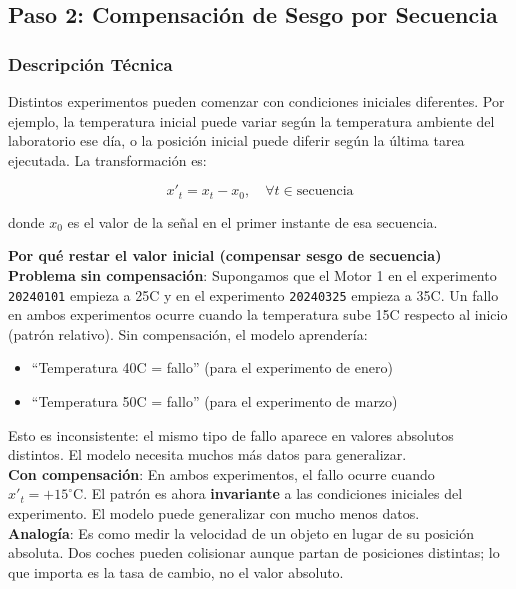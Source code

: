 \documentclass[12pt,a4paper]{article}
\begin{document}
\subsection{Paso 2: Compensaci\'{o}n de Sesgo por Secuencia}

\subsubsection{Descripci\'{o}n T\'{e}cnica}

Distintos experimentos pueden comenzar con condiciones iniciales diferentes. Por
ejemplo, la temperatura inicial puede variar seg\'{u}n la temperatura ambiente del
laboratorio ese d\'{i}a, o la posici\'{o}n inicial puede diferir seg\'{u}n la \'{u}ltima
tarea ejecutada. La transformaci\'{o}n es:

\begin{equation}
  x'_t = x_t - x_0, \quad \forall t \in \text{secuencia}
\end{equation}

donde $x_0$ es el valor de la se\~{n}al en el primer instante de esa secuencia.

\begin{porquebox}
\textbf{Por qu\'{e} restar el valor inicial (compensar sesgo de secuencia)}\\[4pt]
\textbf{Problema sin compensaci\'{o}n}: Supongamos que el Motor 1 en el experimento
\texttt{20240101} empieza a 25\textdegree{}C y en el experimento \texttt{20240325}
empieza a 35\textdegree{}C. Un fallo en ambos experimentos ocurre cuando la temperatura
sube 15\textdegree{}C respecto al inicio (patr\'{o}n relativo). Sin compensaci\'{o}n, el
modelo aprender\'{i}a:
\begin{itemize}[itemsep=2pt]
  \item ``Temperatura 40\textdegree{}C = fallo'' (para el experimento de enero)
  \item ``Temperatura 50\textdegree{}C = fallo'' (para el experimento de marzo)
\end{itemize}
Esto es inconsistente: el mismo tipo de fallo aparece en valores absolutos distintos.
El modelo necesita muchos m\'{a}s datos para generalizar.\\[4pt]
\textbf{Con compensaci\'{o}n}: En ambos experimentos, el fallo ocurre cuando
$x'_t = +15^\circ\text{C}$. El patr\'{o}n es ahora \textbf{invariante} a las
condiciones iniciales del experimento. El modelo puede generalizar con mucho
menos datos.\\[4pt]
\textbf{Analog\'{i}a}: Es como medir la velocidad de un objeto en lugar de su posici\'{o}n
absoluta. Dos coches pueden colisionar aunque partan de posiciones distintas; lo que
importa es la tasa de cambio, no el valor absoluto.
\end{porquebox}
\end{document}
